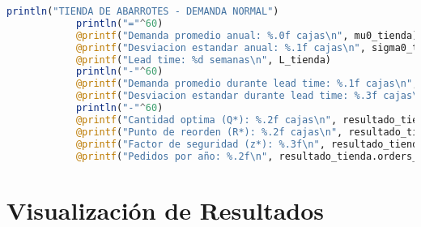 \documentclass[12pt,a4paper]{book}
\begin{document}
\begin{tcolorbox}[enhanced,colback=azulclaro,colframe=azulprincipal,boxrule=2pt,arc=8pt,
		title={\bfseries\color{white} \faCode\ DEMANDA NORMAL - TIENDA DE ABARROTES},breakable]
\begin{lstlisting}[language=Julia,basicstyle=\footnotesize\ttfamily]
			println("TIENDA DE ABARROTES - DEMANDA NORMAL")
			println("="^60)
			@printf("Demanda promedio anual: %.0f cajas\n", mu0_tienda)
			@printf("Desviacion estandar anual: %.1f cajas\n", sigma0_tienda)
			@printf("Lead time: %d semanas\n", L_tienda)
			println("-"^60)
			@printf("Demanda promedio durante lead time: %.1f cajas\n", resultado_tienda.muL)
			@printf("Desviacion estandar durante lead time: %.3f cajas\n", resultado_tienda.sigmaL)
			println("-"^60)
			@printf("Cantidad optima (Q*): %.2f cajas\n", resultado_tienda.Q_star)
			@printf("Punto de reorden (R*): %.2f cajas\n", resultado_tienda.R_star)
			@printf("Factor de seguridad (z*): %.3f\n", resultado_tienda.z_star)
			@printf("Pedidos por año: %.2f\n", resultado_tienda.orders_per_year)
		\end{lstlisting}
		
	\end{tcolorbox}
	
	\section{Visualizaci\'on de Resultados}
	
\end{document}
